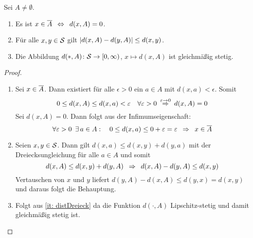 \begin{lemma} \label{lemma: 2.3} Sei $A \neq \emptyset$.
	\begin{enumerate}[label={(\arabic*)}]
		\item \label{it: distCharakterisierung} Es ist $x \in\abschluss{A} \equivalent d(x,A)=0$.
		\item \label{it: distDreieck} Für alle $x,y \in \S$ gilt $\abs{d(x,A)-d(y,A)} \le d(x,y)$.
		\item \label{it: distStetig} Die Abbildung $d(*, A) \colon \S \to [0,\infty)$, $x \mapsto d(x,A)$ ist gleichmäßig stetig.
	\end{enumerate}
\end{lemma}

\begin{proof}
	\begin{enumerate}[label=(zu \arabic*), leftmargin=*]
		\item \begin{equivalence}
			\hinrichtung Sei $x \in \abschluss{A}$. Dann existiert für alle $\epsilon > 0$ ein $a \in A$ mit $d(x,a) < \epsilon$. Somit 
			\begin{equation*}
				0 \le d(x,A) \le d(x,a) < \epsilon \quad \forall \epsilon > 0 
				\overset{\epsilon \to 0}{\follows} d(x,A) = 0
			\end{equation*}
			\rueckrichtung Sei $d(x,A)=0$. Dann folgt aus der Infimumseigenschaft:
			\begin{equation*}
				\forall \epsilon > 0 \enskip \exists \, a \in A : \quad 0 \le d(x,a) \le 0 + \epsilon = \epsilon \\
				\follows x \in \abschluss{A}
			\end{equation*}
		\end{equivalence}
		\item Seien $x,y \in \S$. Dann gilt $d(x,a) \le d(x,y) + d(y,a)$ mit der Dreiecksungleichung für alle $a \in A$ und somit
		\begin{equation*}
			d(x,A) \le d(x,y) + d(y,A) 
			\follows d(x,A) - d(y,A) \le d(x,y)
		\end{equation*}
		Vertauschen von $x$ und $y$ liefert $d(y,A) - d(x,A) \le d(y,x) = d(x,y)$ und daraus folgt die Behauptung.
		\item Folgt aus \cref{it: distDreieck} da die Funktion $d(\cdot,A)$ Lipschitz-stetig und damit gleichmäßig stetig ist.
	\end{enumerate}
\end{proof}

